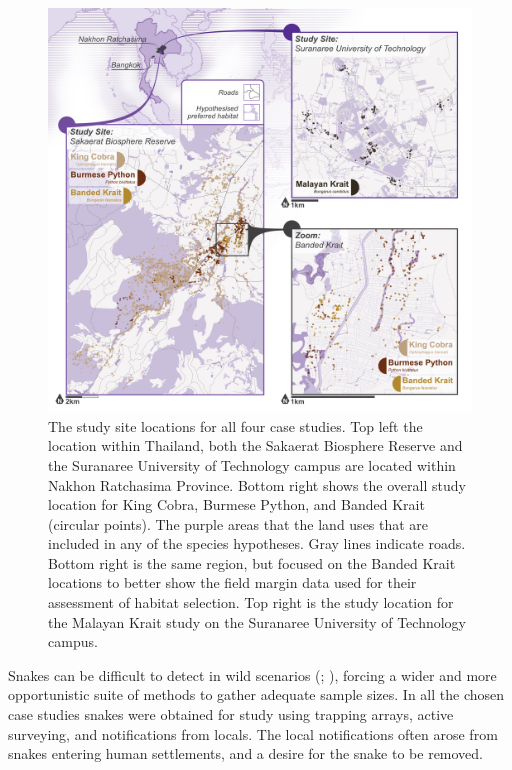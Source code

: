 \documentclass[10pt,a4paper]{article}
\begin{document}
\begin{figure}
\includegraphics[width=1\linewidth]{../ext_images/LocationMap} \caption{The study site locations for all four case studies. Top left the location within Thailand, both the Sakaerat Biosphere Reserve and the Suranaree University of Technology campus are located within Nakhon Ratchasima Province. Bottom right shows the overall study location for King Cobra, Burmese Python, and Banded Krait (circular points). The purple areas that the land uses that are included in any of the species hypotheses. Gray lines indicate roads. Bottom right is the same region, but focused on the Banded Krait locations to better show the field margin data used for their assessment of habitat selection. Top right is the study location for the Malayan Krait study on the Suranaree University of Technology campus.}\label{fig:locationFigure}
\end{figure}

Snakes can be difficult to detect in wild scenarios (; ), forcing a wider and more opportunistic suite of methods to gather adequate sample sizes.
In all the chosen case studies snakes were obtained for study using trapping arrays, active surveying, and notifications from locals.
The local notifications often arose from snakes entering human settlements, and a desire for the snake to be removed.
\end{document}

